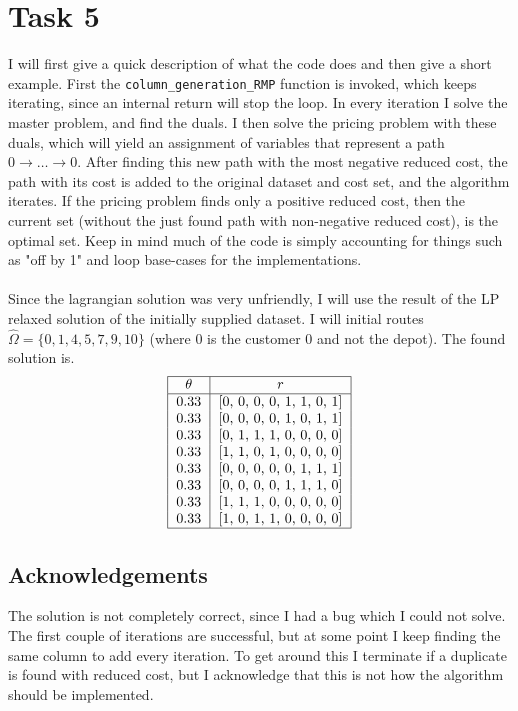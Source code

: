 \documentclass{article}
\begin{document}
    \section{Task 5}
    I will first give a quick description of what the code does and then give a short example.
    First the \texttt{column\_generation\_RMP} function is invoked, which keeps iterating, since an internal return will stop the loop.
    In every iteration I solve the master problem, and find the duals.
    I then solve the pricing problem with these duals, which will yield an assignment of variables that represent a path $0 \rightarrow \dots \rightarrow 0$.
    After finding this new path with the most negative reduced cost, the path with its cost is added to the original dataset and cost set, and the algorithm iterates.
    If the pricing problem finds only a positive reduced cost, then the current set (without the just found path with non-negative reduced cost), is the optimal set.
    Keep in mind much of the code is simply accounting for things such as "off by 1" and loop base-cases for the implementations.
    \\\\
    Since the lagrangian solution was very unfriendly, I will use the result of the LP relaxed solution of the initially supplied dataset.
    I will initial routes $\hat{\Omega} = \{ 0, 1, 4, 5, 7, 9, 10\}$ (where 0 is the customer 0 and not the depot).
    The found solution is.
    \[
        \begin{tabular}{ |c | c | }
            \hline
            $\theta$ & $r$ \\
            \hline
            0.33 & [0, 0, 0, 0, 1, 1, 0, 1]\\
            0.33 & [0, 0, 0, 0, 1, 0, 1, 1]\\
            0.33 & [0, 1, 1, 1, 0, 0, 0, 0]\\
            0.33 & [1, 1, 0, 1, 0, 0, 0, 0]\\
            0.33 & [0, 0, 0, 0, 0, 1, 1, 1]\\
            0.33 & [0, 0, 0, 0, 1, 1, 1, 0]\\
            0.33 & [1, 1, 1, 0, 0, 0, 0, 0]\\
            0.33 & [1, 0, 1, 1, 0, 0, 0, 0]\\
            \hline
        \end{tabular}
    \]
    \subsection{Acknowledgements}
    The solution is not completely correct, since I had a bug which I could not solve.
    The first couple of iterations are successful, but at some point I keep finding the same column to add every iteration.
    To get around this I terminate if a duplicate is found with reduced cost, but I acknowledge that this is not how the algorithm should be implemented.
\end{document}
